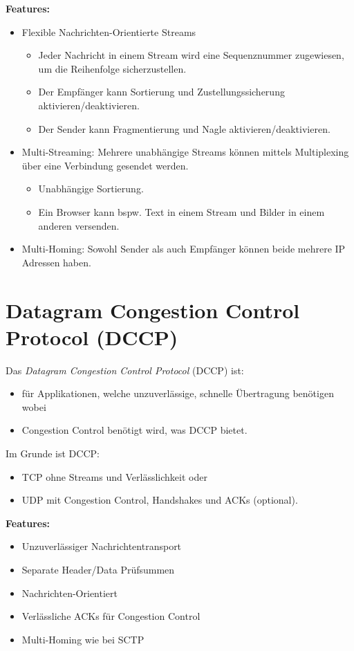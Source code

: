 		\textbf{Features:}
		\begin{itemize}
			\item Flexible Nachrichten-Orientierte Streams
				\begin{itemize}
					\item Jeder Nachricht in einem Stream wird eine Sequenznummer zugewiesen, um die Reihenfolge sicherzustellen.
					\item Der Empfänger kann Sortierung und Zustellungssicherung aktivieren/deaktivieren.
					\item Der Sender kann Fragmentierung und Nagle aktivieren/deaktivieren.
				\end{itemize}
			\item Multi-Streaming: Mehrere unabhängige Streams können mittels Multiplexing über eine Verbindung gesendet werden.
				\begin{itemize}
					\item Unabhängige Sortierung.
					\item Ein Browser kann bspw. Text in einem Stream und Bilder in einem anderen versenden.
				\end{itemize}
			\item Multi-Homing: Sowohl Sender als auch Empfänger können beide mehrere IP Adressen haben.
		\end{itemize}

	\section{Datagram Congestion Control Protocol (DCCP)}
		Das \textit{Datagram Congestion Control Protocol} (DCCP) ist:
		\begin{itemize}
			\item für Applikationen, welche unzuverlässige, schnelle Übertragung benötigen wobei
			\item Congestion Control benötigt wird, was DCCP bietet.
		\end{itemize}

		Im Grunde ist DCCP:
		\begin{itemize}
			\item TCP ohne Streams und Verlässlichkeit oder
			\item UDP mit Congestion Control, Handshakes und ACKs (optional).
		\end{itemize}

		\textbf{Features:}
		\begin{itemize}
			\item Unzuverlässiger Nachrichtentransport
			\item Separate Header/Data Prüfsummen
			\item Nachrichten-Orientiert
			\item Verlässliche ACKs für Congestion Control
			\item Multi-Homing wie bei SCTP
		\end{itemize}

